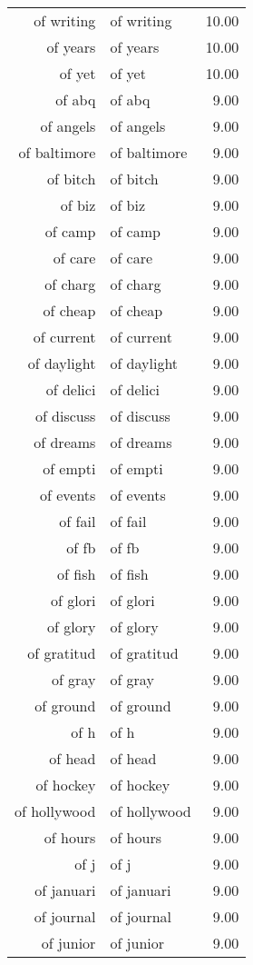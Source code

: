 \begin{table}[ht]
\begin{tabular}{rlr}
  of writing & of writing & 10.00 \\ 
  of years & of years & 10.00 \\ 
  of yet & of yet & 10.00 \\ 
  of abq & of abq & 9.00 \\ 
  of angels & of angels & 9.00 \\ 
  of baltimore & of baltimore & 9.00 \\ 
  of bitch & of bitch & 9.00 \\ 
  of biz & of biz & 9.00 \\ 
  of camp & of camp & 9.00 \\ 
  of care & of care & 9.00 \\ 
  of charg & of charg & 9.00 \\ 
  of cheap & of cheap & 9.00 \\ 
  of current & of current & 9.00 \\ 
  of daylight & of daylight & 9.00 \\ 
  of delici & of delici & 9.00 \\ 
  of discuss & of discuss & 9.00 \\ 
  of dreams & of dreams & 9.00 \\ 
  of empti & of empti & 9.00 \\ 
  of events & of events & 9.00 \\ 
  of fail & of fail & 9.00 \\ 
  of fb & of fb & 9.00 \\ 
  of fish & of fish & 9.00 \\ 
  of glori & of glori & 9.00 \\ 
  of glory & of glory & 9.00 \\ 
  of gratitud & of gratitud & 9.00 \\ 
  of gray & of gray & 9.00 \\ 
  of ground & of ground & 9.00 \\ 
  of h & of h & 9.00 \\ 
  of head & of head & 9.00 \\ 
  of hockey & of hockey & 9.00 \\ 
  of hollywood & of hollywood & 9.00 \\ 
  of hours & of hours & 9.00 \\ 
  of j & of j & 9.00 \\ 
  of januari & of januari & 9.00 \\ 
  of journal & of journal & 9.00 \\ 
  of junior & of junior & 9.00 \\ 

\end{tabular}
\end{table}
